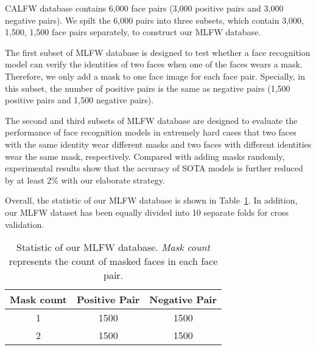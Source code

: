 \documentclass[final]{cvpr}
\begin{document}
CALFW database contains 6,000 face pairs (3,000 positive pairs and 3,000 negative pairs).
We spilt the 6,000 pairs into three subsets, which contain 3,000, 1,500, 1,500 face pairs separately, to construct our MLFW database.

The first subset of MLFW database is designed to test whether a face recognition model can verify the identities of two faces when one of the faces wears a mask.
Therefore, we only add a mask to one face image for each face pair.
Specially, in this subset, the number of positive pairs is the same as negative pairs (1,500 positive pairs and 1,500 negative pairs).

The second and third subsets of MLFW database are designed to evaluate the performance of face recognition models in extremely hard cases that two faces with the same identity wear different masks and two faces with different identities wear the same mask, respectively.
Compared with adding masks randomly, experimental results show that the accuracy of SOTA models is further reduced by at least 2\% with our elaborate strategy.

Overall, the statistic of our MLFW database is shown in Table~\ref{tab:table0}. 
In addition, our MLFW dataset has been equally divided into 10 separate folds for cross validation.

\begin{table}[bh]
	\begin{center}
		\begin{tabular}{c|cc}
			\toprule
			Mask count & Positive Pair & Negative Pair\\
			\midrule
			1 & 1500 & 1500 \\
			2 & 1500 & 1500 \\\bottomrule
		\end{tabular}
	\end{center}
	\caption{Statistic of our MLFW database. \textit{Mask count} represents the count of masked faces in each face pair. }
	\label{tab:table0}
\end{table}
\end{document}
